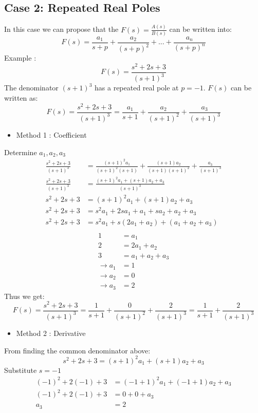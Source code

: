 \documentclass[12pt,a4paper]{article}
\begin{document}
	\subsection{Case 2: Repeated Real Poles}
	In this case we can propose that the \(F(s) = \frac{A(s)}{B(s)}\) can be written into:
	\[
	F(s) = \frac{a_1}{s+p} + \frac{a_2}{(s+p)^2} + ... + \frac{a_n}{(s+p)^n}
	\]
	Example :
	\[
	F(s) = \frac{s^2+2s+3}{(s+1)^3}
	\]
	The denominator \((s+1)^3\) has a repeated real pole at \(p=-1\). \(F(s)\) can be written as:
	\[
	F(s) = \frac{s^2+2s+3}{(s+1)^3} = \frac{a_1}{s+1} + \frac{a_2}{(s+1)^2} + \frac{a_3}{(s+1)^3}
	\]
	\begin{itemize}
		\item Method 1 : Coefficient
	\end{itemize}
	Determine \(a_1,a_2,a_3\)
	\[
	\begin{split}
		\frac{s^2+2s+3}{(s+1)^3} &= \frac{(s+1)^2a_1}{(s+1)^2(s+1)} + \frac{(s+1)a_2}{(s+1)(s+1)^2} + \frac{a_3}{(s+1)^3} \\
		\frac{s^2+2s+3}{(s+1)^3} &= \frac{(s+1)^2a_1+(s+1)a_2+a_3}{(s+1)^3} \\
		s^2+2s+3 &= (s+1)^2a_1+(s+1)a_2+a_3 \\
		s^2+2s+3 &= s^2 a_1 + 2s a_1 + a_1+ sa_2 + a_2 + a_3 \\
		s^2+2s+3 &= s^2 a_1 + s(2a_1+a_2) + (a_1+a_2+a_3)\\
	\end{split}
	\]
	\[
	\begin{split}
		1 &= a_1 \\
		2 &= 2a_1+a_2 \\
		3 &= a_1+a_2+a_3 \\
		\rightarrow a_1 &= 1 \\
		\rightarrow a_2 &= 0 \\
		\rightarrow a_3 &= 2
	\end{split}
	\]
	Thus we get:
	\[
	\boxed{
	F(s) = \frac{s^2+2s+3}{(s+1)^3} = \frac{1}{s+1} + \frac{0}{(s+1)^2} + \frac{2}{(s+1)^3} = \frac{1}{s+1} + \frac{2}{(s+1)^3}}
	\]
	\begin{itemize}
		\item Method 2 : Derivative
	\end{itemize}
	From finding the common denominator above:
	\[
		s^2+2s+3 = (s+1)^2a_1+(s+1)a_2+a_3 
	\]
	Substitute \(s = -1\)
	\[
	\begin{split}
		(-1)^2+2(-1)+3 &= (-1+1)^2a_1+(-1+1)a_2+a_3 \\
		(-1)^2+2(-1)+3 &= 0+0+a_3 \\
		a_3 &= 2
	\end{split}
	\]
\end{document}
